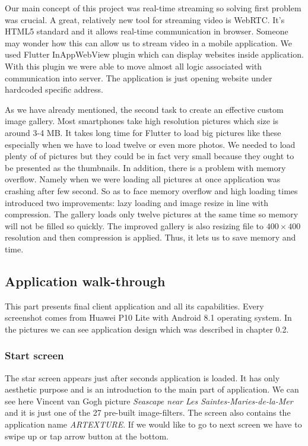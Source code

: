\documentclass[../Main.tex]{subfiles}
\begin{document}
Our main concept of this project was real-time streaming so solving first problem was crucial.
A great, relatively new tool for streaming video is WebRTC.
It's HTML5 standard and it allows real-time communication in browser. 
Someone may wonder how this can allow us to stream video in a mobile application.
We used Flutter InAppWebView plugin which can display websites inside application.
With this plugin we were able to move almost all logic associated with communication into server.
The application is just opening website under hardcoded specific address.

As we have already mentioned, the second task to create an effective custom image gallery. 
Most smartphones take high resolution pictures which size is around 3-4 MB.
It takes long time for Flutter to load big pictures like these especially when
we have to load twelve or even more photos. We needed to load plenty of of pictures but they could be in fact very small because they ought to be presented as the thumbnails.
In addition, there is a problem with 
memory overflow. Namely when we were loading all pictures at once application was
crashing after few second. 
So as to face memory overflow and high loading times introduced two improvements:
lazy loading and image resize in line with compression.
The gallery loads only twelve pictures at the same time so memory will not be filled so quickly.
The improved gallery is also resizing file to $400\times400$ resolution and then compression is applied.
Thus, it lets us to save memory and time.


\subsection{Application walk-through}
This part presents final client application and all its capabilities.
Every screenshot comes from Huawei P10 Lite with Android 8.1 operating system. In the pictures we can see application design which was described in chapter 0.2.

\subsubsection{Start screen}
The star screen appears just after seconds application is loaded. It has only aesthetic purpose and is an introduction to the main part of application. We can see here Vincent van Gogh picture \textit{Seascape near Les Saintes-Maries-de-la-Mer} and it is just one of the 27 pre-built image-filters. The screen also contains the application name \textit{ARTEXTURE}. If we would like to go to next screen we have to swipe up or tap arrow button at the bottom.
\end{document}
